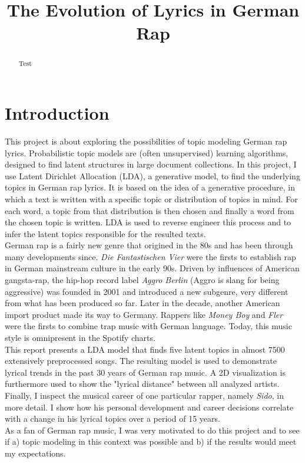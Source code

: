 \documentclass[conference]{IEEEtran}
\begin{document}
\title{The Evolution of Lyrics in German Rap}


\author{
}

\maketitle

\begin{abstract}
Test
\end{abstract}

\section{Introduction}
This project is about exploring the possibilities of topic modeling German rap lyrics. Probabilistic topic models are (often unsupervised) learning algorithms, designed to find latent structures in large document collections. In this project, I use Latent Dirichlet Allocation (LDA), a generative model, to find the underlying topics in German rap lyrics. It is based on the idea of a generative procedure, in which a text is written with a specific topic or distribution of topics in mind. For each word, a topic from that distribution is then chosen and finally a word from the chosen topic is written. LDA is used to reverse engineer this process and to infer the latent topics responsible for the resulted texts.\\
German rap is a fairly new genre that origined in the 80s and has been through many developments since. \textit{Die Fantastischen Vier} were the firsts to establish rap in German mainstream culture in the early 90s. Driven by influences of American gangsta-rap, the hip-hop record label \textit{Aggro Berlin} (Aggro is slang for being aggressive) was founded in 2001 and introduced a new subgenre, very different from what has been produced so far. Later in the decade, another American import product made its way to Germany. Rappers like \textit{Money Boy} and \textit{Fler} were the firsts to combine trap music with German language. Today, this music style is omnipresent in the Spotify charts.\\
This report presents a LDA model that finds five latent topics in almost 7500 extensively preprocessed songs. The resulting model is used to demonstrate lyrical trends in the past 30 years of German rap music. A 2D visualization is furthermore used to show the "lyrical distance" between all analyzed artists. Finally, I inspect the musical career of one particular rapper, namely \textit{Sido}, in more detail. I show how his personal development and career decisions correlate with a change in his lyrical topics over a period of 15 years.\\
As a fan of German rap music, I was very motivated to do this project and to see if a) topic modeling in this context was possible and b) if the results would meet my expectations.
\end{document}
